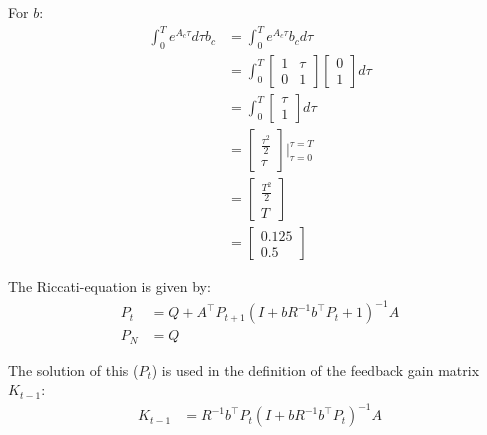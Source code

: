 \documentclass[11pt, a4paper, english]{NTNUoving}
\begin{document}
\begin{oppgave}
\begin{punkt}
        For $b$:
        \begin{align*}
            \int_0^T e^{A_c \tau} d\tau b_c &= \int_0^T e^{A_c \tau} b_c d\tau \\
            &= \int_0^T \begin{bmatrix}
                1 & \tau \\ 0 & 1
            \end{bmatrix} \begin{bmatrix}
                0 \\ 1
            \end{bmatrix} d\tau \\
            &= \int_0^T \begin{bmatrix}
                \tau \\ 1
            \end{bmatrix} d\tau \\
            &= \begin{bmatrix}
                \frac{\tau^2}{2} \\
                \tau
            \end{bmatrix} \biggr\rvert_{\tau = 0}^{\tau = T}\\
            &= \begin{bmatrix}
                \frac{T^2}{2} \\ T
            \end{bmatrix} \\
            &= \begin{bmatrix}
                0.125 \\ 0.5
            \end{bmatrix}
        \end{align*}
    \end{punkt}

    \begin{punkt}
        The Riccati-equation is given by:
        \begin{align*}
            P_t &= Q + A^\top P_{t+1}(I + bR^{-1}b^\top P_t+1)^{-1} A \\
            P_N &= Q
        \end{align*}

        The solution of this ($P_t$) is used in the definition of the feedback gain matrix $K_{t-1}$:
        \begin{align*}
            K_{t-1} &= R^{-1}b^\top P_t(I+bR^{-1}b^\top P_t)^{-1}A
        \end{align*}


\end{punkt}
\end{oppgave}
\end{document}
